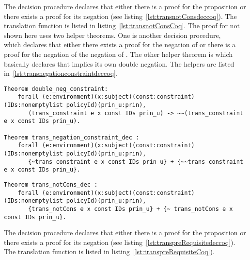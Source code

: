 The decision procedure  declares that either there is a proof for the proposition  or there exists a proof for its negation (see listing~\ref{lst:transnotConsdeccoq}). The translation function  is listed in listing~\ref{lst:transnotConsCoq}. The proof for  not shown here uses two helper theorems. One is another decision procedure, \\  which declares that either there exists a proof for the negation of  or there is a proof for the negation of the negation of . The other helper theorem is  which basically declares that  implies its own double negation. The helpers are listed in~\ref{lst:transnegationconstraintdeccoq}.

\begin{lstlisting}
Theorem double_neg_constraint:
    forall (e:environment)(x:subject)(const:constraint)(IDs:nonemptylist policyId)(prin_u:prin),
       (trans_constraint e x const IDs prin_u) -> ~~(trans_constraint e x const IDs prin_u).
  
Theorem trans_negation_constraint_dec :
    forall (e:environment)(x:subject)(const:constraint)(IDs:nonemptylist policyId)(prin_u:prin),
       {~trans_constraint e x const IDs prin_u} + {~~trans_constraint e x const IDs prin_u}.       
\end{lstlisting}

\begin{minipage}[c]{0.95\textwidth}
\begin{lstlisting}
Theorem trans_notCons_dec :
    forall (e:environment)(x:subject)(const:constraint)(IDs:nonemptylist policyId)(prin_u:prin),
       {trans_notCons e x const IDs prin_u} + {~ trans_notCons e x const IDs prin_u}.

\end{lstlisting}
\end{minipage}

The decision procedure  declares that either there is a proof for the proposition  or there exists a proof for its negation (see listing~\ref{lst:transpreRequisitedeccoq}). The translation function  is listed in listing~\ref{lst:transpreRequisiteCoq}). 



